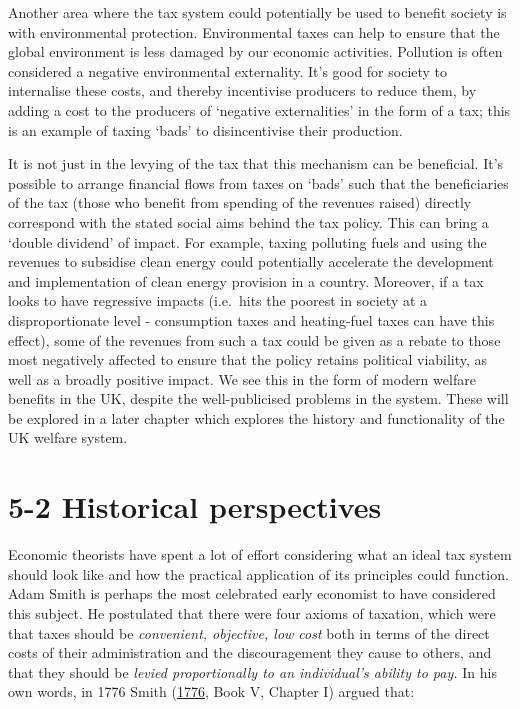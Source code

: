 \documentclass[]{tufte-handout}
\begin{document}
Another area where the tax system could potentially be used to benefit
society is with environmental protection. Environmental taxes can help
to ensure that the global environment is less damaged by our economic
activities. Pollution is often considered a negative environmental
externality. It's good for society to internalise these costs, and
thereby incentivise producers to reduce them, by adding a cost to the
producers of `negative externalities' in the form of a tax; this is an
example of taxing `bads' to disincentivise their production.

It is not just in the levying of the tax that this mechanism can be
beneficial. It's possible to arrange financial flows from taxes on
`bads' such that the beneficiaries of the tax (those who benefit from
spending of the revenues raised) directly correspond with the stated
social aims behind the tax policy. This can bring a `double dividend' of
impact. For example, taxing polluting fuels and using the revenues to
subsidise clean energy could potentially accelerate the development and
implementation of clean energy provision in a country. Moreover, if a
tax looks to have regressive impacts (i.e.~hits the poorest in society
at a disproportionate level - consumption taxes and heating-fuel taxes
can have this effect), some of the revenues from such a tax could be
given as a rebate to those most negatively affected to ensure that the
policy retains political viability, as well as a broadly positive
impact. We see this in the form of modern welfare benefits in the UK,
despite the well-publicised problems in the system. These will be
explored in a later chapter which explores the history and functionality
of the UK welfare system.

\hypertarget{historical-perspectives}{%
\section{5-2 Historical perspectives}\label{historical-perspectives}}

Economic theorists have spent a lot of effort considering what an ideal
tax system should look like and how the practical application of its
principles could function. Adam Smith is perhaps the most celebrated
early economist to have considered this subject. He postulated that
there were four axioms of taxation, which were that taxes should be
\emph{convenient, objective, low cost} both in terms of the direct costs
of their administration and the discouragement they cause to others, and
that they should be \emph{levied proportionally to an individual's
ability to pay.} In his own words, in 1776 Smith
(\protect\hyperlink{ref-smith1776wealth}{1776}, Book V, Chapter I)
argued that:
\end{document}
